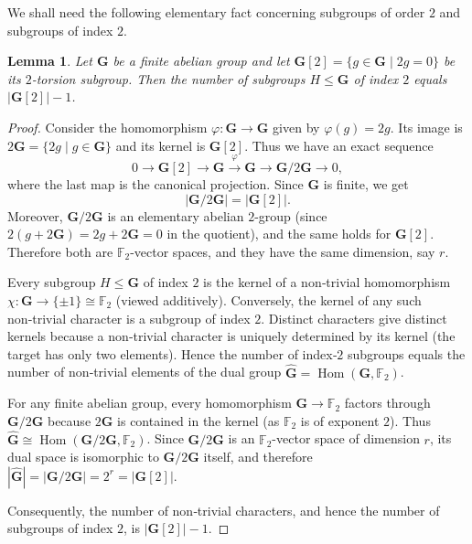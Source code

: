 \documentclass[journal,12pt,onecolumn]{IEEEtran}
\newtheorem{lemma}[theorem]{Lemma}
\begin{document}
We shall need the following elementary fact concerning subgroups of order $2$ and subgroups of index $2$.
\begin{lemma}\label{lemma:order_two}
    Let $\mathbf{G}$ be a finite abelian group and let $\mathbf{G}[2] = \{g \in \mathbf{G} \mid 2g = 0\}$ be its $2$-torsion subgroup. Then the number of subgroups $H \le \mathbf{G}$ of index $2$ equals $|\mathbf{G}[2]| - 1$.
\end{lemma}

\begin{proof}
    Consider the homomorphism $\varphi: \mathbf{G} \to \mathbf{G}$ given by $\varphi(g) = 2g$. Its image is $2\mathbf{G} = \{2g \mid g \in \mathbf{G}\}$ and its kernel is $\mathbf{G}[2]$. Thus we have an exact sequence
    \[
    0 \longrightarrow \mathbf{G}[2] \longrightarrow \mathbf{G} \stackrel{\varphi}{\longrightarrow} \mathbf{G} \longrightarrow \mathbf{G}/2\mathbf{G} \longrightarrow 0,
    \]
    where the last map is the canonical projection. Since $\mathbf{G}$ is finite, we get
    \[
    |\mathbf{G}/2\mathbf{G}| = |\mathbf{G}[2]|.
    \]
    Moreover, $\mathbf{G}/2\mathbf{G}$ is an elementary abelian $2$-group (since $2(g+2\mathbf{G})=2g+2\mathbf{G}=0$ in the quotient), and the same holds for $\mathbf{G}[2]$. Therefore both are $\mathbb{F}_2$-vector spaces, and they have the same dimension, say $r$.

    Every subgroup $H \le \mathbf{G}$ of index $2$ is the kernel of a non‑trivial homomorphism $\chi: \mathbf{G} \to \{\pm 1\} \cong \mathbb{F}_2$ (viewed additively). Conversely, the kernel of any such non‑trivial character is a subgroup of index $2$. Distinct characters give distinct kernels because a non‑trivial character is uniquely determined by its kernel (the target has only two elements). Hence the number of index‑$2$ subgroups equals the number of non‑trivial elements of the dual group $\widehat{\mathbf{G}} = \operatorname{Hom}(\mathbf{G}, \mathbb{F}_2)$.

    For any finite abelian group, every homomorphism $\mathbf{G} \to \mathbb{F}_2$ factors through $\mathbf{G}/2\mathbf{G}$ because $2\mathbf{G}$ is contained in the kernel (as $\mathbb{F}_2$ is of exponent $2$). Thus $\widehat{\mathbf{G}} \cong \operatorname{Hom}(\mathbf{G}/2\mathbf{G}, \mathbb{F}_2)$. Since $\mathbf{G}/2\mathbf{G}$ is an $\mathbb{F}_2$-vector space of dimension $r$, its dual space is isomorphic to $\mathbf{G}/2\mathbf{G}$ itself, and therefore $|\widehat{\mathbf{G}}| = |\mathbf{G}/2\mathbf{G}| = 2^r = |\mathbf{G}[2]|$.

    Consequently, the number of non‑trivial characters, and hence the number of subgroups of index $2$, is $|\mathbf{G}[2]| - 1$.
\end{proof}
\end{document}
